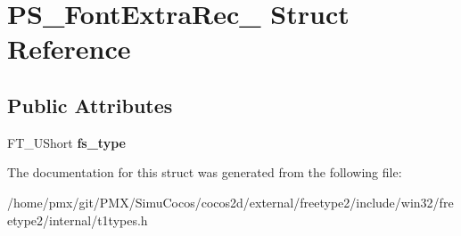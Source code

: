 \hypertarget{structPS__FontExtraRec__}{}\section{P\+S\+\_\+\+Font\+Extra\+Rec\+\_\+ Struct Reference}
\label{structPS__FontExtraRec__}
\subsection*{Public Attributes}
\begin{DoxyCompactItemize}
\item 
\mbox{\label{structPS__FontExtraRec___a048e1e57ee974c3e05e9a88476e6b8a9}} 
F\+T\+\_\+\+U\+Short {\bfseries fs\+\_\+type}
\end{DoxyCompactItemize}


The documentation for this struct was generated from the following file\+:\begin{DoxyCompactItemize}
\item 
/home/pmx/git/\+P\+M\+X/\+Simu\+Cocos/cocos2d/external/freetype2/include/win32/freetype2/internal/t1types.\+h\end{DoxyCompactItemize}

